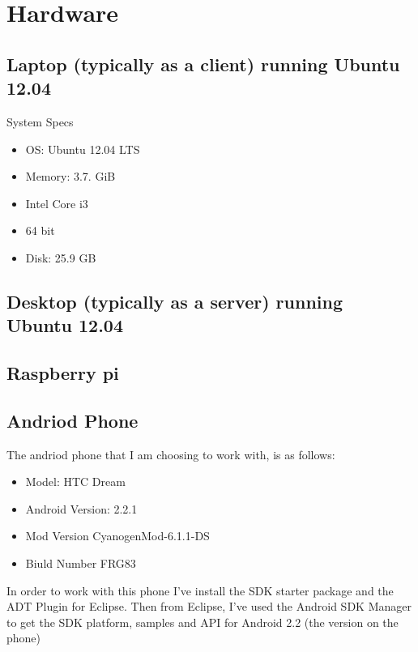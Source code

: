 \documentclass[12pt,a4paper,oneside]{article}
\begin{document}
\section{Hardware} 

\subsection{Laptop (typically as a client) running Ubuntu 12.04}
System Specs
\begin{itemize}
\item OS: Ubuntu 12.04 LTS
\item Memory: 3.7. GiB
\item Intel Core i3
\item 64 bit
\item Disk: 25.9 GB
\end{itemize}

\subsection{Desktop (typically as a server) running Ubuntu 12.04}

\subsection{Raspberry pi}

\subsection{Andriod Phone} 
The andriod phone that I am choosing to work with, is as follows:
\begin{itemize}
\item Model: HTC Dream
\item Android Version: 2.2.1
\item Mod Version CyanogenMod-6.1.1-DS
\item Biuld Number FRG83
\end{itemize}

In order to work with this phone I've install the SDK starter package and the ADT Plugin for Eclipse. Then from Eclipse, I've used the Android SDK Manager to get the SDK platform, samples and API for Android 2.2 (the version on the phone)
\end{document}
